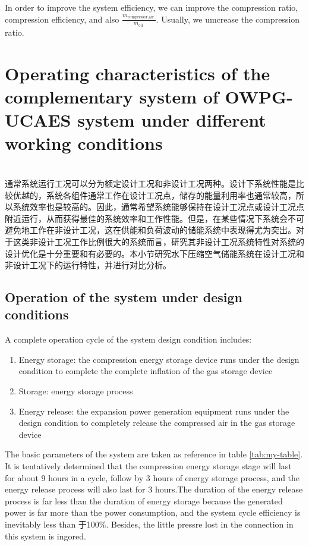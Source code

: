 \documentclass[journal,onecolumn]{IEEEtran}
\begin{document}
In order to improve the system efficiency, we can improve the compression ratio, compression efficiency, and also $ \frac{m_{\text {compressor,air }}}{m_{\text {oil }}} $. Usually, we umcrease the compression ratio. 

\section{Operating characteristics of the complementary system of OWPG-UCAES system under different working conditions}
\ \\

通常系统运行工况可以分为额定设计工况和非设计工况两种。设计下系统性能是比较优越的，系统各组件通常工作在设计工况点，储存的能量利用率也通常较高，所以系统效率也是较高的。因此，通常希望系统能够保持在设计工况点或设计工况点附近运行，从而获得最佳的系统效率和工作性能。但是，在某些情况下系统会不可避免地工作在非设计工况，这在供能和负荷波动的储能系统中表现得尤为突出。对于这类非设计工况工作比例很大的系统而言，研究其非设计工况系统特性对系统的设计优化是十分重要和有必要的。本小节研究水下压缩空气储能系统在设计工况和非设计工况下的运行特性，并进行对比分析。

\subsection{Operation of the system under design conditions}

A complete operation cycle of the system design condition includes:
\begin{enumerate}
	\item Energy storage: the compression energy storage device runs under the design condition to complete the complete inflation of the gas storage device
	\item Storage: energy storage process 
	\item Energy release: the expansion power generation equipment runs under the design condition to completely release the compressed air in the gas storage device
\end{enumerate}

The basic parameters of the system are taken as reference in table \ref{tab:my-table}. It is tentatively determined that the compression energy storage stage will last for about 9 hours in a cycle, follow by 3 hours of energy storage process, and the energy release process will also last for 3 hours.The duration of the energy release process is far less than the duration of energy storage because the generated power is far more than the power consumption, and the system cycle efficiency is inevitably less than 于100\%. Besides, the little pressre lost in the connection in this system is ingored. 
\end{document}
